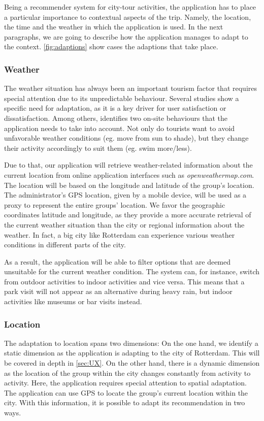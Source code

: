 \documentclass[11pt,a4paper,oneside]{article}
\begin{document}
Being a recommender system for city-tour activities, the application has to place a particular importance to contextual aspects of the trip. Namely, the location, the time and the weather in which the application is used. In the next paragraphs, we are going to describe how the application manages to adapt to the context. \autoref{fig:adaptions} show cases the adaptions that take place.

\subsubsection{Weather}
The weather situation has always been an important tourism factor that requires special attention due to its unpredictable behaviour. Several studies show a specific need for adaptation, as it is a key driver for user satisfaction or dissatisfaction.\cite{becken_ImportanceClimateWeather_2010} Among others, \citeauthor{defreitas_TourismClimatologyEvaluating_2003} identifies two on-site behaviours that the application needs to take into account. Not only do tourists want to avoid unfavorable weather conditions (eg. move from sun to shade), but they change their activity accordingly to suit them (eg. swim more/less). 

Due to that, our application will retrieve weather-related information about the current location from online application interfaces such as \emph{openweathermap.com}. The location will be based on the longitude and latitude of the group's location. The administrator's GPS location, given by a mobile device, will be used as a proxy to represent the entire groups' location. We favor the geographic coordinates latitude and longitude, as they provide a more accurate retrieval of the current weather situation than the city or regional information about the weather. In fact, a big city like Rotterdam can experience various weather conditions in different parts of the city. 

As a result, the application will be able to filter options that are deemed unsuitable for the current weather condition. The system can, for instance, switch from outdoor activities to indoor activities and vice versa.\cite{creemers2015meteorological} This means that a park visit will not appear as an alternative during heavy rain, but indoor activities like museums or bar visits instead.

\subsubsection{Location}
The adaptation to location spans two dimensions: On the one hand, we identify a static dimension as the application is adapting to the city of Rotterdam. This will be covered in depth in \autoref{sec:UX}. On the other hand, there is a dynamic dimension as the location of the group within the city changes constantly from activity to activity. Here, the application requires special attention to spatial adaptation. The application can use GPS to locate the group's current location within the city. With this information, it is possible to adapt its recommendation in two ways. 
\end{document}
